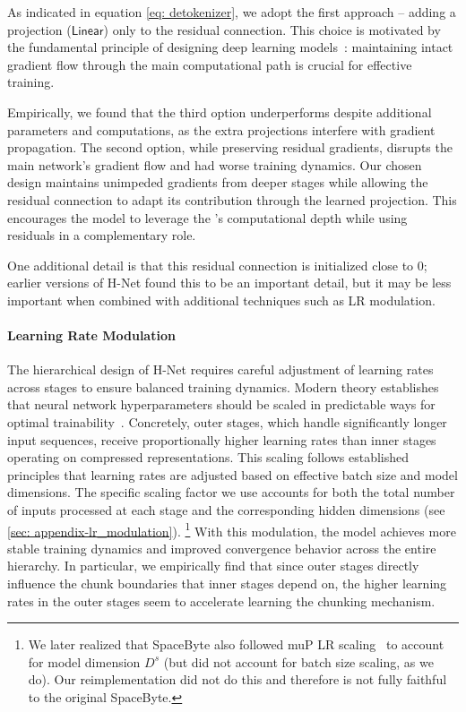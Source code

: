 As indicated in equation \eqref{eq: detokenizer}, we adopt the first approach -- adding a projection ($\mathsf{Linear}$) only to the residual connection.
This choice is motivated by the fundamental principle of designing deep learning models~\citep{ResNet}: maintaining intact gradient flow through the main computational path is crucial for effective training.

Empirically, we found that the third option underperforms despite additional parameters and computations, as the extra projections interfere with gradient propagation.
The second option, while preserving residual gradients, disrupts the main network's gradient flow and had worse training dynamics.
Our chosen design maintains unimpeded gradients from deeper stages while allowing the residual connection to adapt its contribution through the learned projection.
This encourages the model to leverage the \main{}'s computational depth while using residuals in a complementary role.

One additional detail is that this residual connection is initialized close to 0; earlier versions of H-Net found this to be an important detail, but it may be less important when combined with additional techniques such as LR modulation.


\paragraph{Learning Rate Modulation}
The hierarchical design of H-Net requires careful adjustment of learning rates across stages to ensure balanced training dynamics.
Modern theory establishes that neural network hyperparameters should be scaled in predictable ways for optimal trainability~\citep{yang2020feature}.
Concretely, outer stages, which handle significantly longer input sequences, receive proportionally higher learning rates than inner stages operating on compressed representations.
This scaling follows established principles that learning rates are adjusted based on effective batch size and model dimensions.
The specific scaling factor we use accounts for both the total number of inputs processed at each stage and the corresponding hidden dimensions (see \cref{sec: appendix-lr_modulation}).
\footnote{We later realized that SpaceByte also followed muP LR scaling~\citep{yang2020feature} to account for model dimension $D^s$ \citep[Appendix B.2]{SpaceByte} (but did not account for batch size scaling, as we do). Our reimplementation did not do this and therefore is not fully faithful to the original SpaceByte.}
With this modulation, the model achieves more stable training dynamics and improved convergence behavior across the entire hierarchy.
In particular, we empirically find that since outer stages directly influence the chunk boundaries that inner stages depend on, the higher learning rates in the outer stages seem to accelerate learning the chunking mechanism.


